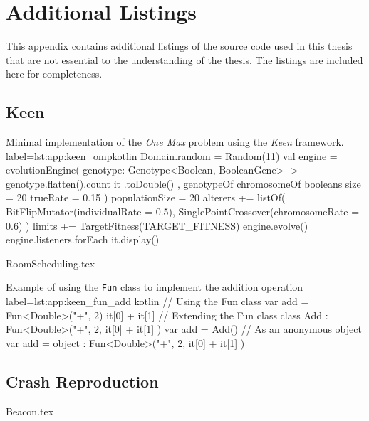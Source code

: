 \chapter{Additional Listings}
\label{app:Listings}
    This appendix contains additional listings of the source code used in this
    thesis that are not essential to the understanding of the thesis.
    The listings are included here for completeness.
    
    \section{Keen}
        \begin{code}{
            Minimal implementation of the \textit{One Max} problem using the \textit{Keen} framework.
        }{label=lst:app:keen_omp}{kotlin}
            Domain.random = Random(11)
            val engine =
                evolutionEngine(
                    { genotype: Genotype<Boolean, BooleanGene> -> genotype.flatten().count { it }.toDouble() },
                    genotypeOf {
                        chromosomeOf {
                            booleans {
                                size = 20
                                trueRate = 0.15
                            }
                        }
                    }) {
                    populationSize = 20
                    alterers += listOf(
                        BitFlipMutator(individualRate = 0.5), SinglePointCrossover(chromosomeRate = 0.6)
                    )
                    limits += TargetFitness(TARGET_FITNESS)
                }
            engine.evolve()
            engine.listeners.forEach { it.display() }
        \end{code}

        {RoomScheduling.tex}

        \begin{code}{
            Example of using the \texttt{Fun} class to implement the addition 
            operation
        }{
            label=lst:app:keen_fun_add
        }{kotlin}
            // Using the Fun class
            var add = Fun<Double>("+", 2) { it[0] + it[1] }
            // Extending the Fun class
            class Add : Fun<Double>("+", 2, { it[0] + it[1] })
            var add = Add()
            // As an anonymous object
            var add = object : Fun<Double>("+", 2, { it[0] + it[1] }) {}
        \end{code}

    \section{Crash Reproduction}
        {Beacon.tex}

